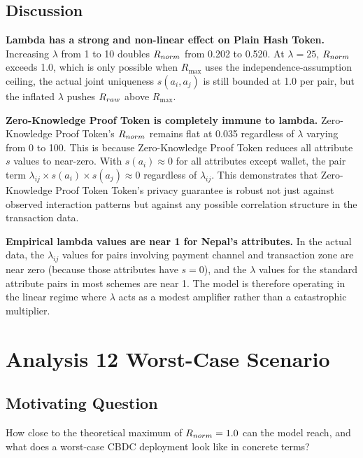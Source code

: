 \subsection{Discussion}

\textbf{Lambda has a strong and non-linear effect on
Plain Hash Token.} Increasing $\lambda$ from 1 to 10
doubles $R_{norm}$ from 0.202 to 0.520. At $\lambda = 25$,
$R_{norm}$ exceeds 1.0, which is only possible when
$R_{\mathrm{max}}$ uses the independence-assumption
ceiling, the actual joint uniqueness $s(a_i, a_j)$ is
still bounded at 1.0 per pair, but the inflated $\lambda$
pushes $R_{raw}$ above $R_{\mathrm{max}}$.

\textbf{Zero-Knowledge Proof Token is completely immune to lambda.}
Zero-Knowledge Proof Token's $R_{norm}$ remains flat at 0.035 regardless of
$\lambda$ varying from 0 to 100. This is because Zero-Knowledge Proof Token reduces
all attribute $s$ values to near-zero. With $s(a_i) \approx 0$
for all attributes except wallet, the pair term
$\lambda_{ij} \times s(a_i) \times s(a_j) \approx 0$
regardless of $\lambda_{ij}$. This demonstrates that Zero-Knowledge Proof Token
Token's privacy guarantee is robust not just against observed
interaction patterns but against any possible correlation
structure in the transaction data.

\textbf{Empirical lambda values are near 1 for Nepal's
attributes.} In the actual data, the $\lambda_{ij}$ values
for pairs involving payment channel and transaction zone are
near zero (because those attributes have $s = 0$), and the
$\lambda$ values for the standard attribute pairs in most
schemes are near 1. The model is therefore operating in the
linear regime where $\lambda$ acts as a modest amplifier
rather than a catastrophic multiplier.

\section{Analysis 12 Worst-Case Scenario}\label{sec:a12}

\subsection{Motivating Question}

How close to the theoretical maximum of $R_{norm} = 1.0$ can
the model reach, and what does a worst-case CBDC deployment
look like in concrete terms?

